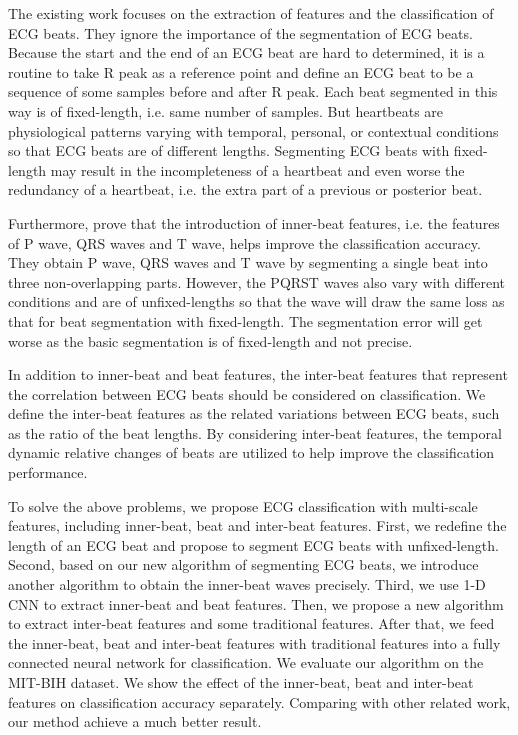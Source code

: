 \documentclass[wcp]{jmlr}
\begin{document}
The existing work focuses on the extraction of features and the classification of ECG beats. They ignore the importance of the segmentation of ECG beats. Because the start and the end of an ECG beat are hard to determined, it is a routine to take R peak as a reference point and define an ECG beat to be a sequence of some samples before and after R peak. Each beat segmented in this way is of fixed-length, i.e. same number of samples. But heartbeats are physiological patterns varying with temporal, personal, or contextual conditions so that ECG beats are of different lengths. Segmenting ECG beats with fixed-length may result in the incompleteness of a heartbeat and even worse the redundancy of a heartbeat, i.e. the extra part of a previous or posterior beat.


Furthermore, \cite{xiang2018ecg} prove that the introduction of inner-beat features, i.e. the features of P wave, QRS waves and T wave, helps improve the classification accuracy. They obtain P wave, QRS waves and T wave by segmenting a single beat into three non-overlapping parts. However, the PQRST waves also vary with different conditions and are of unfixed-lengths so that the wave will draw the same loss as that for beat segmentation with fixed-length. The segmentation error will get worse as the basic segmentation is of fixed-length and not precise.


In addition to inner-beat and beat features, the inter-beat features that represent the correlation between ECG beats should be considered on classification. We define the inter-beat features as the related variations between ECG beats, such as the ratio of the beat lengths. By considering inter-beat features, the temporal dynamic relative changes of beats are utilized to help improve the classification performance.

  
To solve the above problems, we propose ECG classification with multi-scale features, including inner-beat, beat and inter-beat features. First, we redefine the length of an ECG beat and propose to segment ECG beats with unfixed-length. Second, based on our new algorithm of segmenting ECG beats, we introduce another algorithm to obtain the inner-beat waves precisely. Third, we use 1-D CNN to extract inner-beat and beat features. Then, we propose a new algorithm to extract inter-beat features and some traditional features. After that, we feed the inner-beat, beat and inter-beat features with traditional features into a fully connected neural network for classification. We evaluate our algorithm on the MIT-BIH dataset. We show the effect of the inner-beat, beat and inter-beat features on classification accuracy separately. Comparing with other related work, our method achieve a much better result.
  
\end{document}
